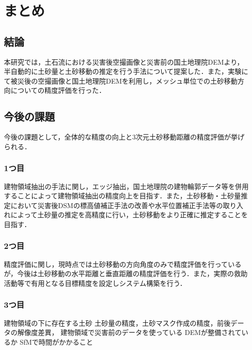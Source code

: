 \chapter{まとめ}
  \section{結論}
    本研究では，土石流における災害後空撮画像と災害前の国土地理院DEMより，半自動的に土砂量と土砂移動の推定を行う手法について提案した．また，実験にて被災後の空撮画像と国土地理院DEMを利用し，メッシュ単位での土砂移動方向についての精度評価を行った．


  \section{今後の課題}
    今後の課題として，全体的な精度の向上と3次元土砂移動距離の精度評価が挙げられる．

    \subsection{1つ目}
      建物領域抽出の手法に関し，エッジ抽出，国土地理院の建物輪郭データ等を併用することによって建物領域抽出の精度向上を目指す．また，土砂移動・土砂量推定において災害後DSMの標高値補正手法の改善や水平位置補正手法\cite{課題1}等の取り入れによって土砂量の推定を高精度に行い，土砂移動をより正確に推定することを目指す．

    \subsection{2つ目}
      精度評価に関し，現時点では土砂移動の方向角度のみで精度評価を行っているが，今後は土砂移動の水平距離と垂直距離の精度評価を行う．また，実際の救助活動等で有用となる目標精度を設定しシステム構築を行う．

    \subsection{3つ目}
      建物領域の下に存在する土砂
      土砂量の精度，土砂マスク作成の精度，前後データの解像度差異，
      建物領域で災害前のデータを使っている
      DEMが整備されているか
      SfMで時間がかかること
